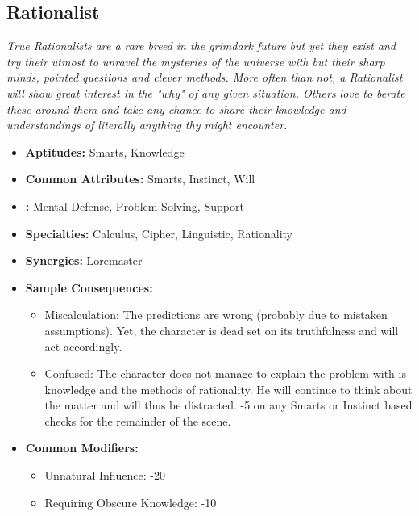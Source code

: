  \subsection{Rationalist}\label{Rationalist}
 \textit{True Rationalists are a rare breed in the grimdark future but yet they exist and try their utmost to unravel the mysteries of the universe with but their sharp minds, pointed questions and clever methods.
 More often than not, a Rationalist will show great interest in the "why" of any given situation.
 Others love to berate these around them and take any chance to share their knowledge and understandings of literally anything thy might encounter.}
 \begin{itemize}
 	\item \textbf{Aptitudes:} Smarts, Knowledge
 	\item \textbf{Common Attributes:} Smarts, Instinct, Will
 	\item \textbf{:} Mental Defense, Problem Solving, Support
 	\item \textbf{Specialties:} Calculus, Cipher, Linguistic, Rationality
 	\item \textbf{Synergies:} Loremaster
 	\item \textbf{Sample Consequences:} 
 	\begin{itemize}
 		\item Miscalculation: The predictions are wrong (probably due to mistaken assumptions). Yet, the character is dead set on its truthfulness and will act accordingly.
 		\item Confused: The character does not manage to explain the problem with is knowledge and the methods of rationality. He will continue to think about the matter and will thus be distracted. -5 on any Smarts or Instinct based checks for the remainder of the scene.
 	\end{itemize}
 	\item \textbf{Common Modifiers:}
 	\begin{itemize}
 		\item Unnatural Influence: -20
 		\item Requiring Obscure Knowledge: -10
 	\end{itemize}
 \end{itemize}

